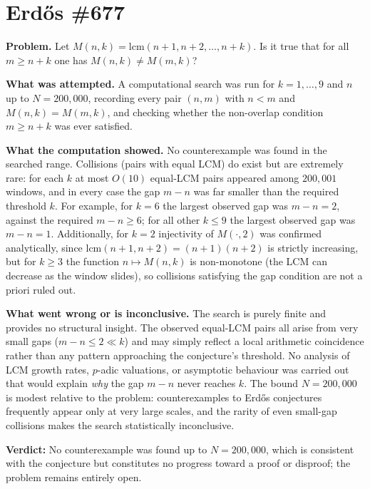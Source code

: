 \section{Erd\H{o}s \#677}

\textbf{Problem.} Let $M(n,k) = \mathrm{lcm}(n+1, n+2, \ldots, n+k)$. Is it true that for all $m \geq n+k$ one has $M(n,k) \neq M(m,k)$?

\textbf{What was attempted.} A computational search was run for $k = 1, \ldots, 9$ and $n$ up to $N = 200{,}000$, recording every pair $(n, m)$ with $n < m$ and $M(n,k) = M(m,k)$, and checking whether the non-overlap condition $m \geq n + k$ was ever satisfied.

\textbf{What the computation showed.} No counterexample was found in the searched range. Collisions (pairs with equal LCM) do exist but are extremely rare: for each $k$ at most $O(10)$ equal-LCM pairs appeared among $200{,}001$ windows, and in every case the gap $m - n$ was far smaller than the required threshold $k$. For example, for $k = 6$ the largest observed gap was $m - n = 2$, against the required $m - n \geq 6$; for all other $k \leq 9$ the largest observed gap was $m - n = 1$. Additionally, for $k = 2$ injectivity of $M(\cdot, 2)$ was confirmed analytically, since $\mathrm{lcm}(n+1, n+2) = (n+1)(n+2)$ is strictly increasing, but for $k \geq 3$ the function $n \mapsto M(n,k)$ is non-monotone (the LCM can decrease as the window slides), so collisions satisfying the gap condition are not a priori ruled out.

\textbf{What went wrong or is inconclusive.} The search is purely finite and provides no structural insight. The observed equal-LCM pairs all arise from very small gaps ($m - n \leq 2 \ll k$) and may simply reflect a local arithmetic coincidence rather than any pattern approaching the conjecture's threshold. No analysis of LCM growth rates, $p$-adic valuations, or asymptotic behaviour was carried out that would explain \emph{why} the gap $m - n$ never reaches $k$. The bound $N = 200{,}000$ is modest relative to the problem: counterexamples to Erd\H{o}s conjectures frequently appear only at very large scales, and the rarity of even small-gap collisions makes the search statistically inconclusive.

\textbf{Verdict:} No counterexample was found up to $N = 200{,}000$, which is consistent with the conjecture but constitutes no progress toward a proof or disproof; the problem remains entirely open.